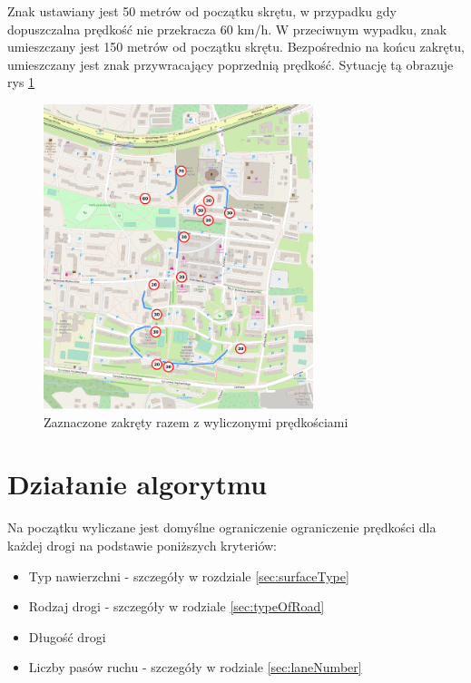 Znak ustawiany jest 50 metrów od początku skrętu, w przypadku gdy dopuszczalna prędkość nie przekracza 60 km/h. W przeciwnym wypadku, znak umieszczany jest 150 metrów od początku skrętu. Bezpośrednio na końcu zakrętu, umieszczany jest znak przywracający poprzednią prędkość. Sytuację tą obrazuje rys \ref{sec:zakretySpeed}
\begin{figure}[h]
\caption{Zaznaczone zakręty razem z wyliczonymi prędkościami}
\label{sec:zakretySpeed}
\centering
\includegraphics[width=0.7\textwidth]{CurvesSpeed}
\end{figure}

\newpage
\section{Działanie algorytmu}
\label{sec:speedLimitLocalization}



Na początku wyliczane jest domyślne ograniczenie ograniczenie prędkości dla każdej drogi na podstawie poniższych kryteriów:
\begin{itemize}
\item Typ nawierzchni - szczegóły w rozdziale \ref{sec:surfaceType}
\item Rodzaj drogi - szczegóły w rodziale \ref{sec:typeOfRoad}
\item Długość drogi
\item Liczby pasów ruchu - szczegóły w rodziale \ref{sec:laneNumber}
\end{itemize}

